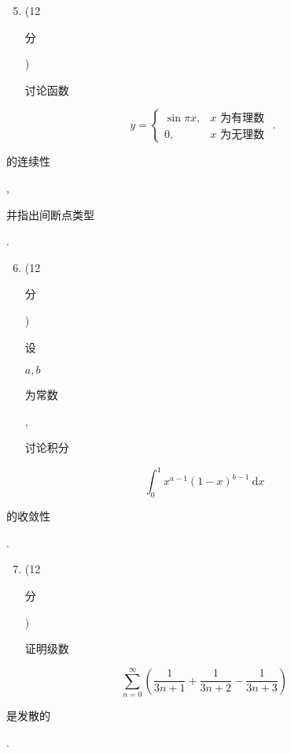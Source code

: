 \documentclass[10pt]{article}
\begin{document}
\begin{enumerate}
  \setcounter{enumi}{4}
  \item (12 \begin{CJK}{UTF8}{mj}分\end{CJK}) \begin{CJK}{UTF8}{mj}讨论函数\end{CJK}
\end{enumerate}
$$
y=\left\{\begin{array}{ll}
\sin \pi x, & x \text { 为有理数 } \\
0, & x \text { 为无理数 }
\end{array}\right. \text {. }
$$
\begin{CJK}{UTF8}{mj}的连续性\end{CJK}, \begin{CJK}{UTF8}{mj}并指出间断点类型\end{CJK}.

\begin{enumerate}
  \setcounter{enumi}{5}
  \item (12 \begin{CJK}{UTF8}{mj}分\end{CJK}) \begin{CJK}{UTF8}{mj}设\end{CJK} $a, b$ \begin{CJK}{UTF8}{mj}为常数\end{CJK}, \begin{CJK}{UTF8}{mj}讨论积分\end{CJK}
\end{enumerate}
$$
\int_{0}^{1} x^{a-1}(1-x)^{b-1} \mathrm{~d} x
$$
\begin{CJK}{UTF8}{mj}的收敛性\end{CJK}.

\begin{enumerate}
  \setcounter{enumi}{6}
  \item (12 \begin{CJK}{UTF8}{mj}分\end{CJK}) \begin{CJK}{UTF8}{mj}证明级数\end{CJK}
\end{enumerate}
$$
\sum_{n=0}^{\infty}\left(\frac{1}{3 n+1}+\frac{1}{3 n+2}-\frac{1}{3 n+3}\right)
$$
\begin{CJK}{UTF8}{mj}是发散的\end{CJK}.
\end{document}
